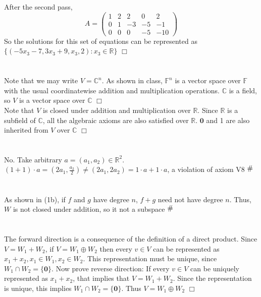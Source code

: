 \documentclass{article}
\newcommand{\contra}{\raisebox{\depth}{\#}}
\begin{document}
After the second pass,
$$ A= \left(\begin{matrix}1&2&2&0&2\\0&1&-3&-5&-1\\0&0&0&-5&-10\end{matrix}\right) $$
So the solutions for this set of equations can be represented as $\{(-5x_3-7,3x_3 + 9, x_3, 2) : x_3 \in \mathbb{R}\}$ $\Box$

\section{}
Note that we may write $V = \mathbb{C}^n$. As shown in class, $\mathbb{F}^n$ is a vector space over $\mathbb{F}$ with the usual coordinatewise addition and multiplication operations. $\mathbb{C}$ is a field, so $V$ is a vector space over $\mathbb{C}$ $\Box$
\\
Note that $V$ is closed under addition and multiplication over $\mathbb{R}$. Since $\mathbb{R}$ is a subfield of $\mathbb{C}$, all the algebraic axioms are also satisfied over $\mathbb{R}$. $\pmb{0}$ and 1 are also inherited from $V$ over $\mathbb{C}$ $\Box$

\section{}
No. Take arbitrary $a = (a_1,a_2) \in \mathbb{R}^2$. $(1+1)\cdot a = (2a_1,\frac{a_2}{2}) \neq (2a_1,2a_2) = 1\cdot a + 1\cdot a$, a violation of axiom V8 $\contra$

\section{}
As shown in (1b), if $f$ and $g$ have degree $n$, $f+g$ need not have degree $n$. Thus, $W$ is not closed under addition, so it not a subspace $\contra$

\section{}
The forward direction is a consequence of the definition of a direct product. Since $V = W_1 + W_2$, if $V = W_1 \oplus W_2$ then every $v\in V$ can be represented as $x_1 + x_2, x_1 \in W_1, x_2 \in W_2$. This representation must be unique, since $W_1 \cap W_2 = \{\pmb{0}\}$.
Now prove reverse direction:
If every $v\in V$ can be uniquely represented as $x_1 + x_2$, that implies that $V = W_1 + W_2$. Since the representation is unique, this implies $W_1 \cap W_2 = \{\pmb{0}\}$. Thus $V = W_1 \oplus W_2$ $\Box$
\end{document}
